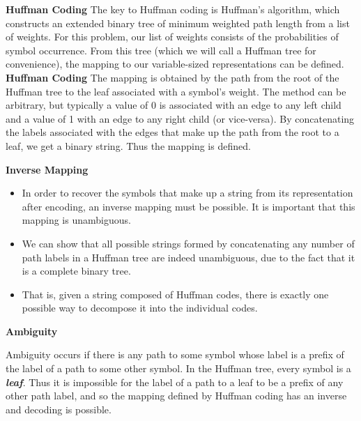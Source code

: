 {
\noindent \textbf{Huffman Coding}
The key to Huffman coding is Huffman's algorithm, which constructs an extended binary tree of minimum weighted path length from a list of weights. For this problem, our list of weights consists of the probabilities of symbol occurrence. From this tree (which we will call a Huffman tree for convenience), the mapping to our variable-sized representations can be defined.
}
{
\noindent \textbf{Huffman Coding}
The mapping is obtained by the path from the root of the Huffman tree to the leaf associated with a symbol's weight. The method can be arbitrary, but typically a value of 0 is associated with an edge to any left child and a value of 1 with an edge to any right child (or vice-versa). By concatenating the labels associated with the edges that make up the path from the root to a leaf, we get a binary string. Thus the mapping is defined.
}
{
\noindent \textbf{Inverse Mapping}
\begin{itemize}
\item In order to recover the symbols that make up a string from its representation after encoding, an inverse mapping must be possible. It is important that this mapping is unambiguous. \item We can show that all possible strings formed by concatenating any number of path labels in a Huffman tree are indeed unambiguous, due to the fact that it is a complete binary tree. \item That is, given a string composed of Huffman codes, there is exactly one possible way to decompose it into the individual codes.
\end{itemize}
}
{

\noindent \textbf{Ambiguity}

Ambiguity occurs if there is any path to some symbol whose label is a prefix of the label of a path to some other symbol. In the Huffman tree, every symbol is a \textbf{\emph{leaf}}. Thus it is impossible for the label of a path to a leaf to be a prefix of any other path label, and so the mapping defined by Huffman coding has an inverse and decoding is possible.
}


















